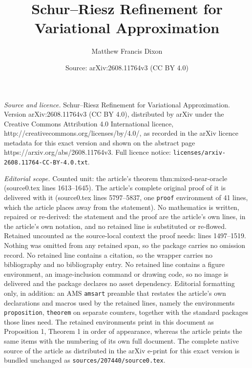 \documentclass[10pt,a4paper]{amsart}
\title{Schur--Riesz Refinement for Variational Approximation}
\author{Matthew Francis Dixon}
\date{Source: arXiv:2608.11764v3 (CC BY 4.0)}
\begin{document}
\maketitle

\noindent\emph{Source and licence.} Schur--Riesz Refinement for Variational Approximation. Version arXiv:2608.11764v3 (CC BY 4.0), distributed by arXiv under the Creative Commons Attribution 4.0 International licence, http://creativecommons.org/licenses/by/4.0/, as recorded in the arXiv licence metadata for this exact version and shown on the abstract page https://arxiv.org/abs/2608.11764v3. Full licence notice: \texttt{licenses/arxiv-2608.11764-CC-BY-4.0.txt}.\par\smallskip

\noindent\textit{Editorial scope.} Counted unit: the article's theorem thm:mixed-near-oracle (source0.tex lines 1613--1645). The article's complete original proof of it is delivered with it (source0.tex lines 5797--5837, one \texttt{proof} environment of 41 lines, which the article places away from the statement). No mathematics is written, repaired or re-derived: the statement and the proof are the article's own lines, in the article's own notation, and no retained line is substituted or re-flowed.  Retained uncounted as the source-local context the proof needs: lines 1497--1519.  Nothing was omitted from any retained span, so the package carries no omission record.  No retained line contains a citation, so the wrapper carries no bibliography and no bibliography entry.  No retained line contains a figure environment, an image-inclusion command or drawing code, so no image is delivered and the package declares no asset dependency.  Editorial formatting only, in addition: an AMS \texttt{amsart} preamble that restates the article's own declarations and macros used by the retained lines, namely the environments \texttt{proposition}, \texttt{theorem} on separate counters, together with the standard packages those lines need.  The retained environments print in this document as Proposition 1, Theorem 1 in order of appearance, whereas the article prints the same items with the numbering of its own full document.  The complete native source of the article as distributed in the arXiv e-print for this exact version is bundled unchanged as \texttt{sources/207440/source0.tex}.
\end{document}
